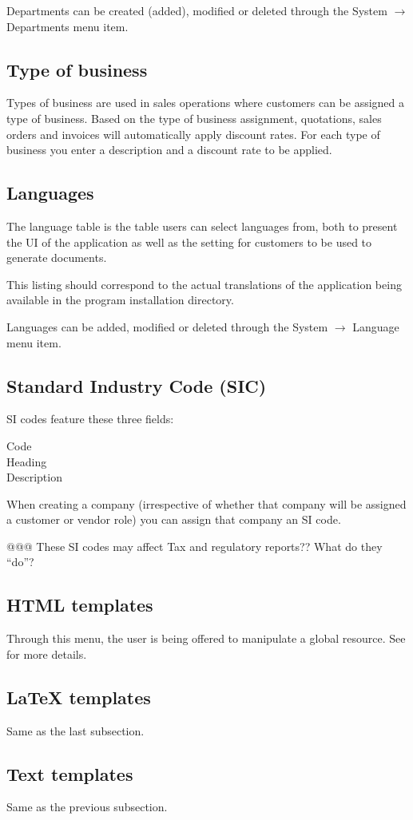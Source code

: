 Departments can be created (added), modified or deleted through the System $\rightarrow$ Departments menu item.

\subsection{Type of business}

Types of business are used in sales operations where customers can be assigned a type
of business. Based on the type of business assignment, quotations, sales orders and
invoices will automatically apply discount rates. For each type of business you enter a description and a discount rate to be applied.

\subsection{Languages}

The language table is the table users can select languages from, both to present
the UI of the application as well as the setting for customers to be used to generate
documents.

This listing should correspond to the actual translations of the application being
available in the program installation directory.

Languages can be added, modified or deleted through the System $\rightarrow$ Language menu item.

\subsection{Standard Industry Code (SIC)}

SI codes feature these three fields:

\begin{description}
\item [Code]
\item [Heading]
\item [Description]
\end{description}

When creating a company (irrespective of whether that company will be assigned a customer
or vendor role) you can assign that company an SI code.

@@@ These SI codes may affect Tax and regulatory reports?? What do they ``do''?

\subsection{HTML templates}

Through this menu, the user is being offered to manipulate a global resource. See
 for more details.

\subsection{LaTeX templates}

Same as the last subsection.

\subsection{Text templates}

Same as the previous subsection.


